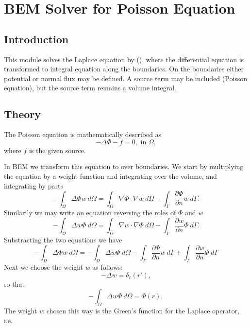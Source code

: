 \chapter{BEM Solver for Poisson Equation}


\section{Introduction}

This module solves the Laplace equation by  (), where
the differential equation is transformed to integral equation along the
boundaries. On the boundaries either potential or normal flux may be defined.
A source term may be included (Poisson equation), but the source term remains
a volume integral.

\section{Theory}

The Poisson equation is mathematically described as
\begin{equation}
-\Delta \Phi - f = 0, \mbox{ in } \Omega,
\end{equation}
where $f$ is the given source.

In BEM we transform this equation to  over boundaries. We start
by multiplying the equation by a weight function and integrating over the volume,
and integrating by parts
\begin{equation}
-\int_\Omega \Delta \Phi w\ d\Omega  = \int_\Omega \nabla\Phi\cdot \nabla w\ d\Omega  -
\int_\Gamma \frac{\partial\Phi}{\partial n} w\ d\Gamma.
\end{equation}
Similarily we may write an equation reversing the roles of $\Phi$ and $w$
\begin{equation}
-\int_\Omega \Delta w \Phi\ d\Omega = \int_\Omega \nabla w\cdot \nabla \Phi\ d\Omega  -
\int_\Gamma \frac{\partial w}{\partial n} \Phi\ d\Gamma.
\end{equation}
Substracting the two equations we have
\begin{equation}
-\int_\Omega \Delta \Phi w\ d\Omega =
-\int_\Omega \Delta w \Phi\ d\Omega -
\int_\Gamma \frac{\partial\Phi}{\partial n} w\ d\Gamma +
\int_\Gamma \frac{\partial w}{\partial n} \Phi\ d\Gamma
\end{equation}
Next we choose the weight $w$ as follows:
\begin{equation}
-\Delta w = \delta_r(r'),
\end{equation}
so that 
\begin{equation}
-\int_\Omega \Delta w \Phi\ d\Omega = \Phi(r), 
\end{equation}
The weight $w$ chosen this way is the Green's function for the Laplace operator,
i.e.

